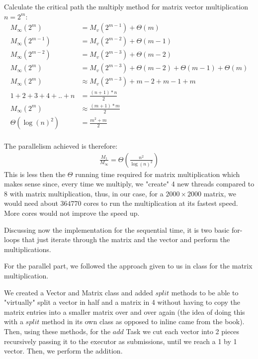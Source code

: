\documentclass[11pt,letterpaper]{exam}
\begin{document}
\begin{questions}
\begin{parts}
\begin{subparts}
							\newpage
							Calculate the critical path the multiply method for matrix vector multiplication $n = 2^m$:
							\begin{align*}
								M_\infty(2^m) &= M_v(2^{m-1}) + \Theta(m)\\
								M_\infty(2^{m-1}) &= M_v(2^{m-2}) + \Theta(m-1)\\
								M_\infty(2^{m-2}) &= M_v(2^{m-3}) + \Theta(m-2)\\
								M_\infty(2^m) &=  M_v(2^{m-3}) + \Theta(m-2) + \Theta(m-1) + \Theta(m)\\
								M_\infty(2^m) &\approx M_v(2^{m-3}) + m-2 + m-1 + m\\
								1+2+3+4+..+n &= \frac{(n+1)*n}{2}\\
								M_\infty(2^m) &\approx \frac{(m+1)*m}{2} \\
								\Theta(\log(n)^2) &= \frac{m^2+m}{2}\\
							\end{align*}

							\subpart
								The parallelism achieved is therefore:
								\begin{align*}
									\frac{M_1}{M_\infty} = \Theta(\frac{n^2}{\log(n)^2})
								\end{align*}
								This is less then the $\Theta$ running time required for matrix multiplication which makes sense since, every time we multiply, we "create" 4 new threads compared to 8 with matrix multiplication, thus, in our case, for a $2000 \times 2000$ matrix, we would need about $364770$ cores to run the multiplication at its fastest speed. More cores would not improve the speed up.

								\quad Discussing now the implementation for the sequential time, it is two basic for-loops that just iterate through the matrix and the vector and perform the multiplications.

								For the parallel part, we followed the approach given to us in class for the matrix multiplication.

								\quad We created a Vector and Matrix class and added $split$ methods to be able to "virtually" split a vector in half and a matrix in 4 without having to copy the matrix entries into a smaller matrix over and over again (the idea of doing this with a $split$ method in its own class as opposed to inline came from the book). Then, using these methods, for the $add$ Task we cut each vector into 2 pieces recursively passing it to the executor as submissions, until we reach a 1 by 1 vector. Then, we perform the addition.


\end{subparts}
\end{parts}
\end{questions}
\end{document}
